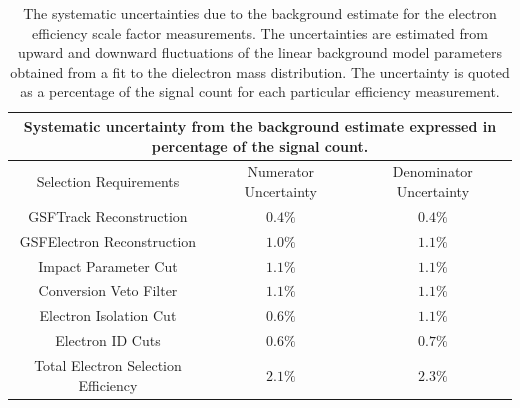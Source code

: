 \documentclass{cmspaper}
\begin{document}
\begin{table}[!ht]
\begin{center}
\begin{tabular}{|c|c|c|}
\hline
 \multicolumn{3}{|c|}{Systematic uncertainty from the background estimate expressed in percentage of the signal count.} \\
\hline
 Selection Requirements & Numerator Uncertainty & Denominator Uncertainty  \\
\hline
\hline
 GSFTrack Reconstruction              & $ 0.4\%$  & $ 0.4\%$  \\
 GSFElectron Reconstruction           & $ 1.0\%$  & $ 1.1\%$  \\
 Impact Parameter Cut                 & $ 1.1\%$  & $ 1.1\%$  \\
 Conversion Veto Filter               & $ 1.1\%$  & $ 1.1\%$  \\
 Electron Isolation Cut               & $ 0.6\%$  & $ 1.1\%$  \\
 Electron ID Cuts                     & $ 0.6\%$  & $ 0.7\%$  \\
\hline                               
 Total Electron Selection Efficiency  & $ 2.1\%$  & $ 2.3\%$  \\
\hline                               
\end{tabular}
\caption{The systematic uncertainties due to the background estimate for the electron efficiency scale factor measurements. The uncertainties are estimated from upward and downward fluctuations of the linear background model parameters obtained from a fit to the dielectron mass distribution. The uncertainty is quoted as a percentage of the signal count for each particular efficiency measurement. \label{tab:ElectronEfficiencySystematicsFromMassFit}}
\end{center}
\end{table}
\end{document}

